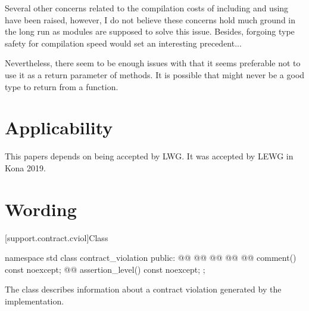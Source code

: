 \documentclass{wg21}
\begin{document}
Several other concerns related to the compilation costs of including and using  have been raised, however, I do not believe these concerns hold much ground in the long run as modules are supposed to solve this issue.
Besides, forgoing type safety for compilation speed would set an interesting precedent...

Nevertheless, there seem to be enough issues with  that it seems
preferable not to use it as a return parameter of  methods.
It is possible that  might never be a good type to return from a function.





\section{Applicability}

This papers depends on \cite{P1208} being accepted by LWG.
It was accepted by LEWG in Kona 2019.

\section{Wording}

[support.contract.cviol]{Class }
%

\begin{codeblock}
	namespace std {
		class contract_violation {
			public:
			@@
			@@
			@@
			@@
			@@ comment() const noexcept;
			@@ assertion_level() const noexcept;
		};
	}
\end{codeblock}

\pnum
The class  describes information about
a contract violation generated by the implementation.
\end{document}
